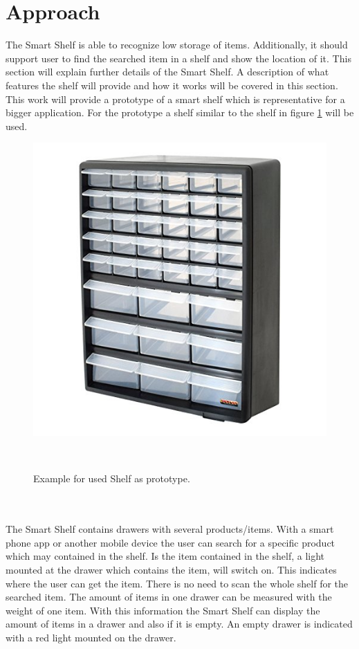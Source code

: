 \documentclass{sigchi}
\begin{document}
\section{Approach}
The Smart Shelf is able to recognize low storage of items. 
Additionally, it should support user to find the searched item in a shelf and show the location of it. 
This section will explain further details of the Smart Shelf. 
A description of what features the shelf will provide and how it works will be covered in this section. 
This work will provide a prototype of a smart shelf which is representative for a bigger application. 
For the prototype a shelf similar to the shelf in figure \ref{fig:example_shelf} will be used. 
%
\begin{figure}
	\includegraphics[width=0.9\columnwidth]{figures/example-prototype-shelf}
	\caption{Example for used Shelf as prototype.}~\label{fig:example_shelf}
\end{figure}
%
\\
\\
The Smart Shelf contains drawers with several products/items. 
With a smart phone app or another mobile device the user can search for a specific product which may contained in the shelf. 
Is the item contained in the shelf, a light mounted at the drawer which contains the item, will switch on. 
This indicates where the user can get the item.
There is no need to scan the whole shelf for the searched item. 
The amount of items in one drawer can be measured with the weight of one item. 
With this information the Smart Shelf can display the amount of items in a drawer and also if it is empty. 
An empty drawer is indicated with a red light mounted on the drawer. 
\end{document}
